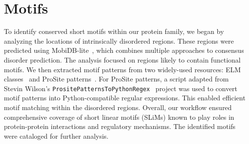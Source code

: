 \section{Motifs}

To identify conserved short motifs within our protein family, we began by analyzing the locations of intrinsically disordered regions. These regions were predicted using MobiDB-lite~\cite{mobidb}, which combines multiple approaches to consensus disorder prediction. The analysis focused on regions likely to contain functional motifs. We then extracted motif patterns from two widely-used resources: ELM classes~\cite{elm} and ProSite patterns~\cite{prosite}. For ProSite patterns, a script adapted from Stevin Wilson's \texttt{PrositePatternsToPythonRegex}~\cite{stevin_wilson} project was used to convert motif patterns into Python-compatible regular expressions. This enabled efficient motif matching within the disordered regions. Overall, our workflow ensured comprehensive coverage of short linear motifs (SLiMs) known to play roles in protein-protein interactions and regulatory mechanisms. The identified motifs were cataloged for further analysis.
